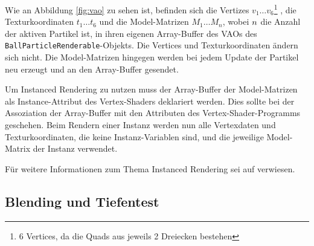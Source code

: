 Wie an Abbildung \ref{fig:vao} zu sehen ist, befinden sich die Vertizes $v_1\dotsc v_6$\footnote{6 Vertices, da die Quads aus jeweils 2 Dreiecken bestehen} , die Texturkoordinaten $t_1\dotsc t_6$ und die Model-Matrizen $M_1\dotsc M_n$, wobei $\mathnormal{n}$ die Anzahl der aktiven Partikel ist, in ihren eigenen Array-Buffer des VAOs des {\texttt{BallParticleRenderable}}-Objekts. Die Vertices und Texturkoordinaten ändern sich nicht. Die Model-Matrizen hingegen werden bei jedem Update der Partikel neu erzeugt und an den Array-Buffer gesendet.

Um Instanced Rendering zu nutzen muss der Array-Buffer der Model-Matrizen als Instance-Attribut des Vertex-Shaders deklariert werden. Dies sollte bei der Assoziation der Array-Buffer mit den Attributen des Vertex-Shader-Programms geschehen.
Beim Rendern einer Instanz werden nun alle Vertexdaten und Texturkoordinaten, die keine Instanz-Variablen sind, und die jeweilige Model-Matrix der Instanz verwendet.

Für weitere Informationen zum Thema Instanced Rendering sei auf \cite{ksls:2013} verwiesen.

\subsection{Blending und Tiefentest}
\label{Kapitel_2_-_Unterkapitel_2.3}
%

